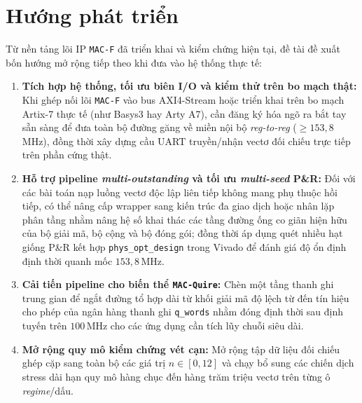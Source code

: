 \section{Hướng phát triển}

Từ nền tảng lõi IP \texttt{MAC-F} đã triển khai và kiểm chứng hiện tại, đề tài
đề xuất bốn hướng mở rộng tiếp theo khi đưa vào hệ thống thực tế:
\begin{enumerate}
  \item \textbf{Tích hợp hệ thống, tối ưu biên I/O và kiểm thử trên bo mạch thật:}
        Khi ghép nối lõi \texttt{MAC-F} vào bus AXI4-Stream hoặc triển khai trên
        bo mạch Artix-7 thực tế (như Basys3 hay Arty A7), cần đăng ký hóa ngõ ra
        bắt tay sẵn sàng để đưa toàn bộ đường găng về miền nội bộ \textit{reg-to-reg}
        ($\ge 153{,}8$\,MHz), đồng thời xây dựng cầu UART truyền/nhận vectơ đối chiếu
        trực tiếp trên phần cứng thật.
  \item \textbf{Hỗ trợ pipeline \textit{multi-outstanding} và tối ưu \textit{multi-seed} P\&R:}
        Đối với các bài toán nạp luồng vectơ độc lập liên tiếp không mang phụ thuộc
        hồi tiếp, có thể nâng cấp wrapper sang kiến trúc đa giao dịch hoặc nhân
        lặp phân tầng nhằm nâng hệ số khai thác các tầng đường ống co giãn hiện
        hữu của bộ giải mã, bộ cộng và bộ đóng gói; đồng thời áp dụng quét nhiều
        hạt giống P\&R kết hợp \texttt{phys\_opt\_design} trong Vivado để đánh
        giá độ ổn định định thời quanh mốc $153{,}8$\,MHz.
  \item \textbf{Cải tiến pipeline cho biến thể \texttt{MAC-Quire}:} Chèn một
        tầng thanh ghi trung gian để ngắt đường tổ hợp dài từ khối giải mã độ
        lệch từ đến tín hiệu cho phép của ngân hàng thanh ghi \texttt{q\_words}
        nhằm đóng định thời sau định tuyến trên $100$\,MHz cho các ứng dụng cần
        tích lũy chuỗi siêu dài.
  \item \textbf{Mở rộng quy mô kiểm chứng vét cạn:} Mở rộng tập dữ liệu đối chiếu
        ghép cặp sang toàn bộ các giá trị $n \in [0, 12]$ và chạy bổ sung các
        chiến dịch stress dài hạn quy mô hàng chục đến hàng trăm triệu vectơ
        trên từng ô \textit{regime}/dấu.
\end{enumerate}
